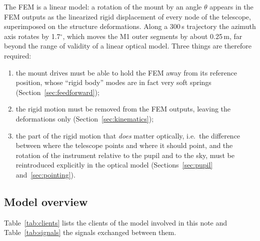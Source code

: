 \documentclass{gmto}
\numberwithin{table}{section}
\numberwithin{equation}{section}
\begin{document}
The FEM is a linear model: a rotation of the mount by an angle $\theta$ appears in the FEM outputs as
the linearized rigid displacement of every node of the telescope, superimposed on the structure
deformations. Along a 300\,s trajectory the azimuth axis rotates by 1.7$^\circ$, which moves
the M1 outer segments by about 0.25\,m, far beyond the range of validity of a linear optical model.
Three things are therefore required:
\begin{enumerate}
\item the mount drives must be able to hold the FEM away from its reference position, whose
  ``rigid body'' modes are in fact very soft springs (Section~\ref{sec:feedforward});
\item the rigid motion must be removed from the FEM outputs, leaving the deformations only
  (Section~\ref{sec:kinematics});
\item the part of the rigid motion that \emph{does} matter optically, i.e.\ the difference between where
  the telescope points and where it should point, and the rotation of the instrument relative to
  the pupil and to the sky, must be reintroduced explicitly in the optical model
  (Sections~\ref{sec:pupil} and~\ref{sec:pointing}).
\end{enumerate}

\subsection{Model overview}
\label{sec:overview}

Table~\ref{tab:clients} lists the clients of the model involved in this note and
Table~\ref{tab:signals} the signals exchanged between them.
\end{document}
